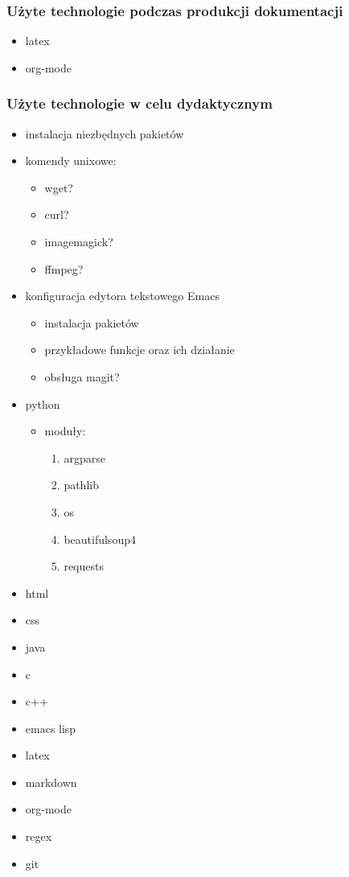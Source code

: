 \documentclass[11pt]{article}
\begin{document}
\subsubsection{Użyte technologie podczas produkcji dokumentacji}
\label{sec:org1039836}
\begin{itemize}
\item latex
\item org-mode
\end{itemize}
\subsubsection{Użyte technologie w celu dydaktycznym}
\label{sec:orgbf721d2}
\begin{itemize}
\item instalacja niezbędnych pakietów
\item komendy unixowe:
\begin{itemize}
\item wget?
\item curl?
\item imagemagick?
\item ffmpeg?
\end{itemize}
\item konfiguracja edytora tekstowego Emacs
\begin{itemize}
\item instalacja pakietów
\item przykładowe funkcje oraz ich działanie
\item obsługa magit?
\end{itemize}
\item python
\begin{itemize}
\item moduły:
\begin{enumerate}
\item argparse
\item pathlib
\item os
\item beautifulsoup4
\item requests
\end{enumerate}
\end{itemize}
\item html
\item css
\item java
\item c
\item c++
\item emacs lisp
\item latex
\item markdown
\item org-mode
\item regex
\item git
\end{itemize}
\end{document}
